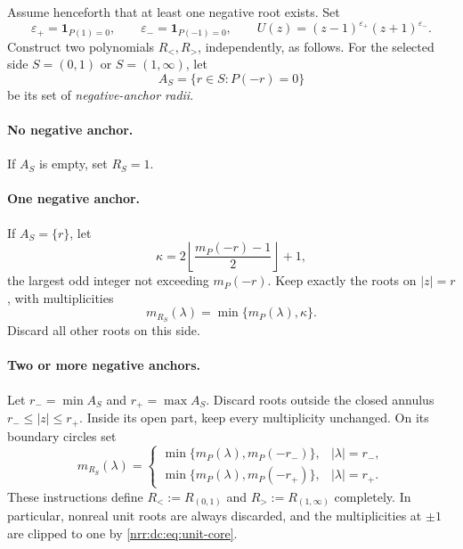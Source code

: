\documentclass[11pt,letterpaper]{article}
\theoremstyle{definition}
\theoremstyle{remark}
\begin{document}
Assume henceforth that at least one negative root exists. Set
\begin{equation}
 \varepsilon_+=\mathbf1_{P(1)=0},\qquad
 \varepsilon_-=\mathbf1_{P(-1)=0},\qquad
 U(z)=(z-1)^{\varepsilon_+}(z+1)^{\varepsilon_-}.
 \label{nrr:dc:eq:unit-core}
\end{equation}
Construct two polynomials $R_<,R_>$, independently, as follows.
For the selected side $S=(0,1)$ or $S=(1,\infty)$, let
\[
 A_S=\{r\in S:P(-r)=0\}
\]
be its set of \emph{negative-anchor radii}.

\paragraph{No negative anchor.}
If $A_S$ is empty, set $R_S=1$.

\paragraph{One negative anchor.}
If $A_S=\{r\}$, let
\begin{equation}
 \kappa=2\left\lfloor\frac{m_P(-r)-1}{2}\right\rfloor+1,
 \label{nrr:dc:eq:odd-cap}
\end{equation}
the largest odd integer not exceeding $m_P(-r)$. Keep exactly the
roots on $|z|=r$, with multiplicities
\begin{equation}
 m_{R_S}(\lambda)=\min\{m_P(\lambda),\kappa\}.
 \label{nrr:dc:eq:one-anchor}
\end{equation}
Discard all other roots on this side.

\paragraph{Two or more negative anchors.}
Let $r_- =\min A_S$ and $r_+=\max A_S$. Discard roots outside the
closed annulus $r_-\le|z|\le r_+$. Inside its open part, keep every
multiplicity unchanged. On its boundary circles set
\begin{equation}
 m_{R_S}(\lambda)=
 \begin{cases}
 \min\{m_P(\lambda),m_P(-r_-)\},&|\lambda|=r_-,\\
 \min\{m_P(\lambda),m_P(-r_+)\},&|\lambda|=r_+.
 \end{cases}
 \label{nrr:dc:eq:two-anchors}
\end{equation}
These instructions define $R_<:=R_{(0,1)}$ and
$R_>:=R_{(1,\infty)}$ completely. In particular, nonreal unit roots
are always discarded, and the multiplicities at $\pm1$ are clipped
to one by \eqref{nrr:dc:eq:unit-core}.
\end{document}
